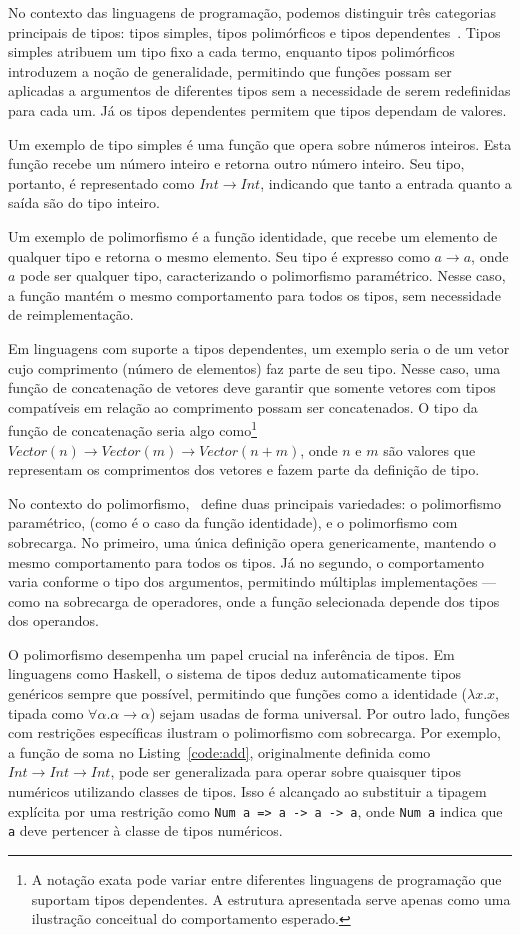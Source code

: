 No contexto das linguagens de programação, podemos distinguir três categorias principais de tipos: tipos simples, tipos polimórficos e tipos dependentes~\cite{pierce2002types}.
Tipos simples atribuem um tipo fixo a cada termo, enquanto tipos polimórficos introduzem a noção de generalidade, permitindo que funções possam ser aplicadas a argumentos de diferentes tipos sem a necessidade de serem redefinidas para cada um.
Já os tipos dependentes permitem que tipos dependam de valores.

Um exemplo de tipo simples é uma função que opera sobre números inteiros.
Esta função recebe um número inteiro e retorna outro número inteiro.
Seu tipo, portanto, é representado como $Int \rightarrow Int$, indicando que tanto a entrada quanto a saída são do tipo inteiro.

Um exemplo de polimorfismo é a função identidade, que recebe um elemento de qualquer tipo e retorna o mesmo elemento.
Seu tipo é expresso como $a \rightarrow a$, onde $a$ pode ser qualquer tipo, caracterizando o polimorfismo paramétrico.
Nesse caso, a função mantém o mesmo comportamento para todos os tipos, sem necessidade de reimplementação.

Em linguagens com suporte a tipos dependentes, um exemplo seria o de um vetor cujo comprimento (número de elementos) faz parte de seu tipo.
Nesse caso, uma função de concatenação de vetores deve garantir que somente vetores com tipos compatíveis em relação ao comprimento possam ser concatenados.
O tipo da função de concatenação seria algo como\footnote{A notação exata pode variar entre diferentes linguagens de programação que suportam tipos dependentes. A estrutura apresentada serve apenas como uma ilustração conceitual do comportamento esperado.} $Vector(n) \rightarrow Vector(m) \rightarrow Vector(n+m)$, onde $n$ e $m$ são valores que representam os comprimentos dos vetores e fazem parte da definição de tipo.

No contexto do polimorfismo,~ define duas principais variedades: o polimorfismo paramétrico, (como é o caso da função identidade), e o polimorfismo com sobrecarga.
No primeiro, uma única definição opera genericamente, mantendo o mesmo comportamento para todos os tipos. 
Já no segundo, o comportamento varia conforme o tipo dos argumentos, permitindo múltiplas implementações — como na sobrecarga de operadores, onde a função selecionada depende dos tipos dos operandos.

O polimorfismo desempenha um papel crucial na inferência de tipos. 
Em linguagens como Haskell, o sistema de tipos deduz automaticamente tipos genéricos sempre que possível, permitindo que funções como a identidade ($\lambda x.x$, tipada como $\forall \alpha. \alpha \to \alpha$) sejam usadas de forma universal. 
Por outro lado, funções com restrições específicas ilustram o polimorfismo com sobrecarga. 
Por exemplo, a função de soma no Listing~\ref{code:add}, originalmente definida como $Int \rightarrow Int \rightarrow Int$, pode ser generalizada para operar sobre quaisquer tipos numéricos utilizando classes de tipos. 
Isso é alcançado ao substituir a tipagem explícita por uma restrição como \texttt{Num a => a -> a -> a}, onde \texttt{Num a} indica que \texttt{a} deve pertencer à classe de tipos numéricos.

